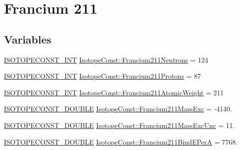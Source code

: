 \hypertarget{group___isotope_const-_francium-_fr211}{}\section{Francium 211}
\label{group___isotope_const-_francium-_fr211}
\subsection*{Variables}
\begin{DoxyCompactItemize}
\item 
\mbox{\hyperlink{group___isotope_const-_macros_ga5f18360b3e99483a35c32d789e62621c}{I\+S\+O\+T\+O\+P\+E\+C\+O\+N\+S\+T\+\_\+\+I\+NT}} \mbox{\hyperlink{group___isotope_const-_francium-_fr211_ga1cbc8b07aee1387d454ad7b48391496c}{Isotope\+Const\+::\+Francium211\+Neutrons}} = 124
\item 
\mbox{\hyperlink{group___isotope_const-_macros_ga5f18360b3e99483a35c32d789e62621c}{I\+S\+O\+T\+O\+P\+E\+C\+O\+N\+S\+T\+\_\+\+I\+NT}} \mbox{\hyperlink{group___isotope_const-_francium-_fr211_gadc45fec3a7e7ca648985f6bb2ea94ebe}{Isotope\+Const\+::\+Francium211\+Protons}} = 87
\item 
\mbox{\hyperlink{group___isotope_const-_macros_ga5f18360b3e99483a35c32d789e62621c}{I\+S\+O\+T\+O\+P\+E\+C\+O\+N\+S\+T\+\_\+\+I\+NT}} \mbox{\hyperlink{group___isotope_const-_francium-_fr211_gaea0e930bc6a2a191b1166e2e9696f0cb}{Isotope\+Const\+::\+Francium211\+Atomic\+Weight}} = 211
\item 
\mbox{\hyperlink{group___isotope_const-_macros_ga8f45a7272ce02c0b4c65c44636ed719a}{I\+S\+O\+T\+O\+P\+E\+C\+O\+N\+S\+T\+\_\+\+D\+O\+U\+B\+LE}} \mbox{\hyperlink{group___isotope_const-_francium-_fr211_ga122882f9692a9e9c36eeab6e32834b01}{Isotope\+Const\+::\+Francium211\+Mass\+Exc}} = -\/4140.
\item 
\mbox{\hyperlink{group___isotope_const-_macros_ga8f45a7272ce02c0b4c65c44636ed719a}{I\+S\+O\+T\+O\+P\+E\+C\+O\+N\+S\+T\+\_\+\+D\+O\+U\+B\+LE}} \mbox{\hyperlink{group___isotope_const-_francium-_fr211_gaff4e9aabd655bba529809ee86287aff4}{Isotope\+Const\+::\+Francium211\+Mass\+Exc\+Unc}} = 11.
\item 
\mbox{\hyperlink{group___isotope_const-_macros_ga8f45a7272ce02c0b4c65c44636ed719a}{I\+S\+O\+T\+O\+P\+E\+C\+O\+N\+S\+T\+\_\+\+D\+O\+U\+B\+LE}} \mbox{\hyperlink{group___isotope_const-_francium-_fr211_gacc7f3747c9bf47d208247e2d4f415c67}{Isotope\+Const\+::\+Francium211\+Bind\+E\+PerA}} = 7768.
\item 

\end{DoxyCompactItemize}
